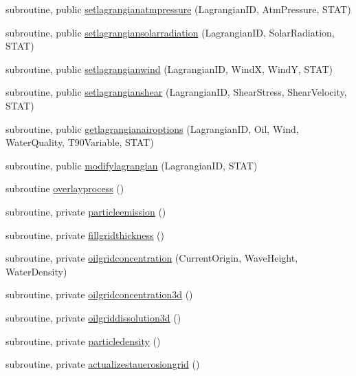 \begin{DoxyCompactItemize}
subroutine, public \mbox{\hyperlink{namespacemodulelagrangian_a219357c04fe0cbde7c3506f0fdb4ec61}{setlagrangianatmpressure}} (Lagrangian\+ID, Atm\+Pressure, S\+T\+AT)
\item 
subroutine, public \mbox{\hyperlink{namespacemodulelagrangian_a26def3f84c8200513c53ea500f051cdd}{setlagrangiansolarradiation}} (Lagrangian\+ID, Solar\+Radiation, S\+T\+AT)
\item 
subroutine, public \mbox{\hyperlink{namespacemodulelagrangian_ab06dca3c92c46b6fb4d05e0c79c7fbd6}{setlagrangianwind}} (Lagrangian\+ID, WindX, WindY, S\+T\+AT)
\item 
subroutine, public \mbox{\hyperlink{namespacemodulelagrangian_ab0d8db7a7c4e175fc509a8c3e6e6efab}{setlagrangianshear}} (Lagrangian\+ID, Shear\+Stress, Shear\+Velocity, S\+T\+AT)
\item 
subroutine, public \mbox{\hyperlink{namespacemodulelagrangian_acfabdebec80bc9e9353be9b171fdbbdb}{getlagrangianairoptions}} (Lagrangian\+ID, Oil, Wind, Water\+Quality, T90\+Variable, S\+T\+AT)
\item 
subroutine, public \mbox{\hyperlink{namespacemodulelagrangian_a1097f962a7a848d12f7f3036993f7b93}{modifylagrangian}} (Lagrangian\+ID, S\+T\+AT)
\item 
subroutine \mbox{\hyperlink{namespacemodulelagrangian_ac5c97cbe4a964c4bf8de40af414143c0}{overlayprocess}} ()
\item 
subroutine, private \mbox{\hyperlink{namespacemodulelagrangian_a529648b66afb4cc44ecf46c2557c0c35}{particleemission}} ()
\item 
subroutine, private \mbox{\hyperlink{namespacemodulelagrangian_a8232b9379a8d2919b7885bb92a286601}{fillgridthickness}} ()
\item 
subroutine, private \mbox{\hyperlink{namespacemodulelagrangian_aac3200bb7a0dbdfeccbc61aa00df6387}{oilgridconcentration}} (Current\+Origin, Wave\+Height, Water\+Density)
\item 
subroutine, private \mbox{\hyperlink{namespacemodulelagrangian_aa09f0dae86aaba5199991f812e815936}{oilgridconcentration3d}} ()
\item 
subroutine, private \mbox{\hyperlink{namespacemodulelagrangian_a39ff5de7cace8c7c236a47233fb2cb43}{oilgriddissolution3d}} ()
\item 
subroutine, private \mbox{\hyperlink{namespacemodulelagrangian_a7a7e141a39c3a112666d37b0f6db988e}{particledensity}} ()
\item 
subroutine, private \mbox{\hyperlink{namespacemodulelagrangian_a9af867ea06d1e0259a9e4cd1a48793bc}{actualizestauerosiongrid}} ()

\end{DoxyCompactItemize}
